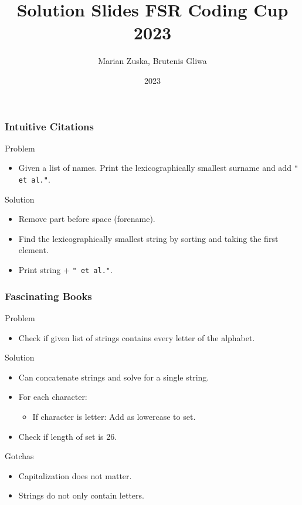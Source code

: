 \documentclass{beamer}
\title{Solution Slides FSR Coding Cup 2023}
\author{Marian Zuska, Brutenis Gliwa}
\institute{Universität Rostock}
\date{2023}
\begin{document}
\frame{\titlepage}

\begin{frame}
    \frametitle{Intuitive Citations}
    \begin{block}{Problem}
        \begin{itemize}
            \item Given a list of names. Print the lexicographically smallest surname and add \texttt{" et al."}.
        \end{itemize}
    \end{block} \pause
    \begin{block}{Solution} 
        \begin{itemize}
            \item Remove part before space (forename). \pause
            \item Find the lexicographically smallest string by sorting and taking the first element. \pause
            \item Print string + \texttt{" et al."}.
        \end{itemize}
    \end{block} 
\end{frame}

\begin{frame}
    \frametitle{Fascinating Books}
    \begin{block}{Problem}
        \begin{itemize}
            \item Check if given list of strings contains every letter of the alphabet.
        \end{itemize}
    \end{block} \pause
    \begin{block}{Solution}
        \begin{itemize}
            \item Can concatenate strings and solve for a single string. \pause
            \item For each character:
            \begin{itemize}
            \item If character is letter: Add as lowercase to set. \pause
            \end{itemize}
        \item Check if length of set is 26.
        \end{itemize}
    \end{block} \pause
    \begin{block}{Gotchas}
        \begin{itemize}
            \item Capitalization does not matter. \pause
            \item Strings do not only contain letters.
        \end{itemize}
    \end{block} 
\end{frame}
\end{document}
